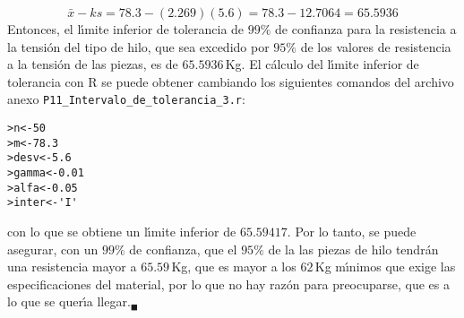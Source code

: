 \begin{solucion}
 \begin{equation*}
  \bar{x} - ks = 78.3 - (2.269)(5.6) = 78.3-12.7064 = 65.5936
 \end{equation*}
 Entonces, el l\'{\i}mite inferior de tolerancia de $99\%$ de confianza para la resistencia a la tensi\'on del tipo de hilo, que sea excedido por $95\%$ de los valores de resistencia a la tensi\'on de las piezas, es de $65.5936\,$Kg. El c\'alculo del l\'{\i}mite inferior de tolerancia con R se puede obtener cambiando los siguientes comandos del archivo anexo \texttt{P11\_Intervalo\_de\_tolerancia\_3.r}:
 \begin{verbatim}
>n<-50
>m<-78.3
>desv<-5.6
>gamma<-0.01
>alfa<-0.05
>inter<-'I'
 \end{verbatim}
 \vspace{-0.5cm}
 con lo que se obtiene un l\'{\i}mite inferior de $65.59417$. Por lo tanto, se puede asegurar, con un $99\%$ de confianza, que el $95\%$ de la las piezas de hilo tendr\'an una resistencia mayor  a $65.59\,$Kg, que es mayor a los $62\,$Kg m\'{\i}nimos que exige las especificaciones del material, por lo que no hay raz\'on para preocuparse, que es a lo que se quer\'{\i}a llegar.${}_{\blacksquare}$
\end{solucion}
